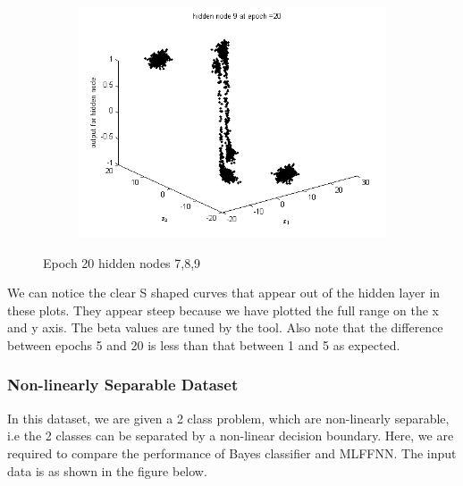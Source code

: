 \documentclass{article}
\begin{document}
\begin{flushleft}
\begin{figure}
\begin{subfigure}{.3\textwidth}
\end{subfigure}
\begin{subfigure}{.3\textwidth}
  \centering
  \includegraphics[width=.8\linewidth]{Classification/linearlySeparable/h20_9}
  
\end{subfigure}
\caption{Epoch 20 hidden nodes 7,8,9}
\end{figure}
We can notice the clear S shaped curves that appear out of the hidden layer in these plots. They appear steep because we have plotted the full range on the x and y axis. The beta values are tuned by the tool. Also note that the difference between epochs 5 and 20 is less than that between 1 and 5 as expected.
\newpage
\end{flushleft}

\subsubsection{Non-linearly Separable Dataset}
\begin{flushleft}

In this dataset, we are given a 2 class problem, which are non-linearly separable, i.e the 2 classes can be separated by a non-linear decision boundary. Here, we are required to compare the performance of Bayes classifier and MLFFNN.
The input data is as shown in the figure below. \\[10pt]

\end{flushleft}
\end{document}
